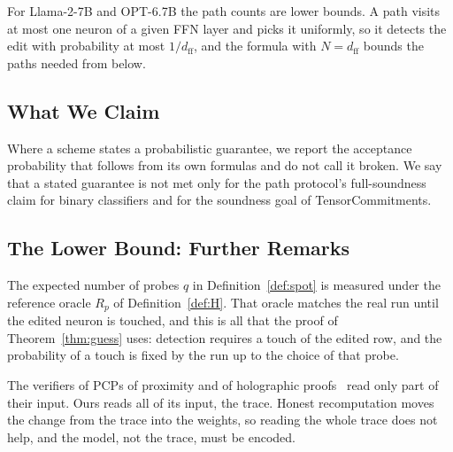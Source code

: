 \noindent For Llama-2-7B and OPT-6.7B the path counts are lower bounds. A path visits at most one
neuron of a given FFN layer and picks it uniformly, so it detects the edit with probability at most
$1/d_{\mathrm{ff}}$, and the formula with $N=d_{\mathrm{ff}}$ bounds the paths needed from below.

\subsection{What We Claim}
\label{ext:attack-disclosure}

Where a scheme states a probabilistic
guarantee, we report the acceptance probability that follows from its own formulas and do not call
it broken. We say that a stated guarantee is not met only for the path protocol's full-soundness
claim for binary classifiers and for the soundness goal of TensorCommitments.

\subsection{The Lower Bound: Further Remarks}
\label{ext:attack-bound}

 The expected number of probes $q$ in Definition~\ref{def:spot} is
measured under the reference oracle $R_p$ of Definition~\ref{def:H}. That oracle matches the real
run until the edited neuron is touched, and this is all that the proof of Theorem~\ref{thm:guess}
uses: detection requires a touch of the edited row, and the probability of a touch is fixed by the
run up to the choice of that probe.

 The verifiers of PCPs of proximity and
of holographic proofs~\cite{bghsv2006robust,bfls1991} read only part of their input. Ours reads all
of its input, the trace. Honest recomputation moves the change from the trace into the weights, so
reading the whole trace does not help, and the model, not the trace, must be encoded.

